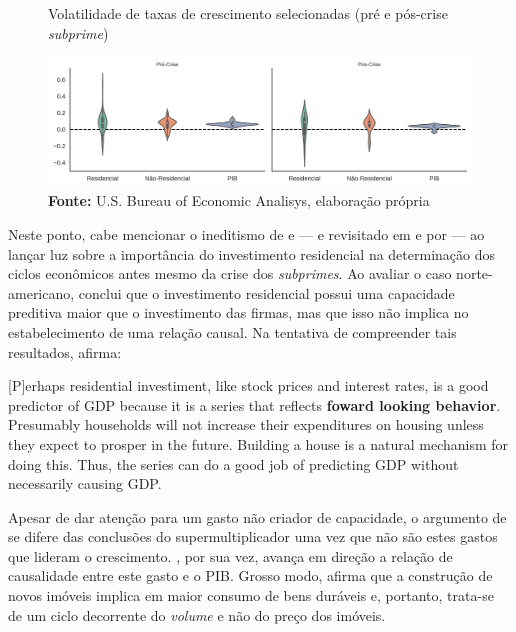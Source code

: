 \begin{figure}[H]
	\centering
	\caption{Volatilidade de taxas de crescimento selecionadas (pré e pós-crise \textit{subprime})}
	\label{FigVolatilidade}
	\includegraphics[width=\textwidth]{../../Dados/Fatos_Estilizados/figs/Volatilidade.png}
	\caption*{\textbf{Fonte:} U.S. Bureau of Economic Analisys, elaboração própria}
\end{figure}

Neste ponto, cabe mencionar o ineditismo de \textcite{green_follow_1997} e \textcite{leamer_housing_2007} --- e revisitado em \textcite{leamer_housing_2015} e por \textcite{fiebiger_trend_2017} --- ao lançar luz sobre a importância do investimento residencial na determinação dos ciclos econômicos antes mesmo da crise dos \textit{subprimes}. 
Ao avaliar o caso norte-americano, \textcite{green_follow_1997} conclui que o investimento residencial possui uma capacidade preditiva maior que o investimento das firmas, mas que isso não implica no estabelecimento de uma relação causal. Na tentativa de compreender tais resultados, afirma:

\begin{citacao}
	
	[P]erhaps residential investiment, like stock prices and interest rates, is a good predictor of GDP because it is a series that reflects \textbf{foward looking behavior}. Presumably households will not increase their expenditures on housing unless they expect to prosper in the future. Building a house is a natural mechanism for doing this. Thus, the series can do a good job of predicting GDP without necessarily causing GDP.
	\cite[p.~267, grifos adicionados]{green_follow_1997}
\end{citacao}
Apesar de dar atenção para um gasto não criador de capacidade, o argumento de \textcite{green_follow_1997} se difere das conclusões do supermultiplicador uma vez que não são estes gastos que lideram o crescimento.
\textcite{leamer_housing_2007}, por sua vez, avança em direção a relação de causalidade entre este gasto e o PIB. Grosso modo, afirma que a construção de novos imóveis implica em maior consumo de bens duráveis e, portanto, trata-se de um ciclo decorrente do \textit{volume} e não do preço dos imóveis. 

